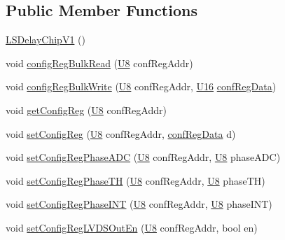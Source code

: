 \subsection*{Public Member Functions}
\begin{DoxyCompactItemize}
\item 
\hyperlink{classLSDelayChipV1_a4dbc01a273a6e044b6f163e12e136134}{L\+S\+Delay\+Chip\+V1} ()
\item 
void \hyperlink{classLSDelayChipV1_a97a50092ce40f6322db946fc580f7230}{config\+Reg\+Bulk\+Read} (\hyperlink{ICECALv3_8h_a3cb25ca6f51f003950f9625ff05536fc}{U8} conf\+Reg\+Addr)
\item 
void \hyperlink{classLSDelayChipV1_afa626b5d52f8723bcaa3205d1cc7a0f8}{config\+Reg\+Bulk\+Write} (\hyperlink{ICECALv3_8h_a3cb25ca6f51f003950f9625ff05536fc}{U8} conf\+Reg\+Addr, \hyperlink{ICECALv3_8h_adf928e51a60dba0df29d615401cc55a8}{U16} \hyperlink{structconfRegData}{conf\+Reg\+Data})
\item 
void \hyperlink{classLSDelayChipV1_a4f338071d49df7eae55020a5f5fa8474}{get\+Config\+Reg} (\hyperlink{ICECALv3_8h_a3cb25ca6f51f003950f9625ff05536fc}{U8} conf\+Reg\+Addr)
\item 
void \hyperlink{classLSDelayChipV1_a11fa2ebfa37c5cf0544ddb68c7d43e94}{set\+Config\+Reg} (\hyperlink{ICECALv3_8h_a3cb25ca6f51f003950f9625ff05536fc}{U8} conf\+Reg\+Addr, \hyperlink{structconfRegData}{conf\+Reg\+Data} d)
\item 
void \hyperlink{classLSDelayChipV1_ad83fb046d3576cdccdb4b4fe59f7ff71}{set\+Config\+Reg\+Phase\+A\+DC} (\hyperlink{ICECALv3_8h_a3cb25ca6f51f003950f9625ff05536fc}{U8} conf\+Reg\+Addr, \hyperlink{ICECALv3_8h_a3cb25ca6f51f003950f9625ff05536fc}{U8} phase\+A\+DC)
\item 
void \hyperlink{classLSDelayChipV1_aa1364ef56bf75884756a8d589cee4328}{set\+Config\+Reg\+Phase\+TH} (\hyperlink{ICECALv3_8h_a3cb25ca6f51f003950f9625ff05536fc}{U8} conf\+Reg\+Addr, \hyperlink{ICECALv3_8h_a3cb25ca6f51f003950f9625ff05536fc}{U8} phase\+TH)
\item 
void \hyperlink{classLSDelayChipV1_a317f739744d1093385306530fe5b312a}{set\+Config\+Reg\+Phase\+I\+NT} (\hyperlink{ICECALv3_8h_a3cb25ca6f51f003950f9625ff05536fc}{U8} conf\+Reg\+Addr, \hyperlink{ICECALv3_8h_a3cb25ca6f51f003950f9625ff05536fc}{U8} phase\+I\+NT)
\item 
void \hyperlink{classLSDelayChipV1_a46a7aee8c7373c6858af9ecd29e9b116}{set\+Config\+Reg\+L\+V\+D\+S\+Out\+En} (\hyperlink{ICECALv3_8h_a3cb25ca6f51f003950f9625ff05536fc}{U8} conf\+Reg\+Addr, bool en)
\item 

\end{DoxyCompactItemize}
